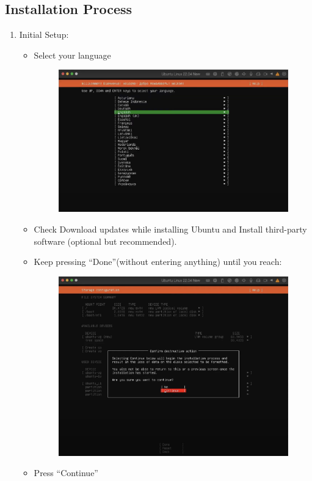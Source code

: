 \documentclass[11pt,a4paper]{article}
\begin{document}
\subsection{Installation Process}
\begin{enumerate}
    \item Initial Setup:
    \begin{itemize}
        \item Select your language
        \begin{figure}[htp]
            \centering
            \includegraphics[width=0.35\linewidth]{images/step15.png}
        \end{figure}
        \item Check Download updates while installing Ubuntu and Install third-party software (optional but recommended).
        \item Keep pressing ``Done''(without entering anything) until you reach:
        \begin{figure}[htp]
            \centering
            \includegraphics[width=0.6\linewidth]{images/step17.png}
        \end{figure}
        \item Press ``Continue''
    \end{itemize}
    

\end{enumerate}
\end{document}
